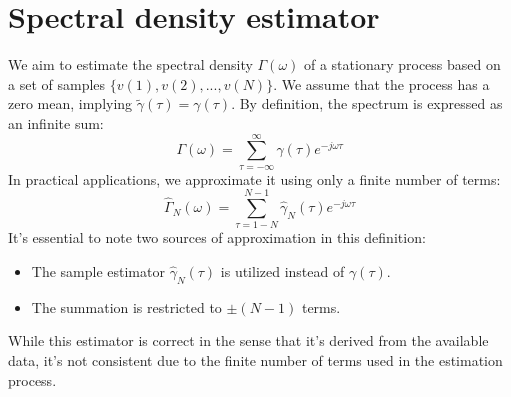 \section{Spectral density estimator}

We aim to estimate the spectral density $\Gamma(\omega)$ of a stationary process based on a set of samples $\{v(1), v(2), ..., v(N)\}$. 
We assume that the process has a zero mean, implying $\tilde{\gamma}(\tau)=\gamma(\tau)$. 
By definition, the spectrum is expressed as an infinite sum:
\[\Gamma(\omega)=\sum_{\tau=-\infty}^{\infty}\gamma(\tau)e^{-j\omega\tau}\]
In practical applications, we approximate it using only a finite number of terms:
\[\widehat{\Gamma}_N(\omega)=\sum_{\tau=1-N}^{N-1}\widehat{\gamma}_N(\tau)e^{-j\omega\tau}\]
It's essential to note two sources of approximation in this definition:
\begin{itemize}
    \item The sample estimator $\widehat{\gamma}_N(\tau)$ is utilized instead of $\gamma(\tau)$. 
    \item The summation is restricted to $\pm(N-1)$ terms.
\end{itemize}
While this estimator is correct in the sense that it's derived from the available data, it's not consistent due to the finite number of terms used in the estimation process.